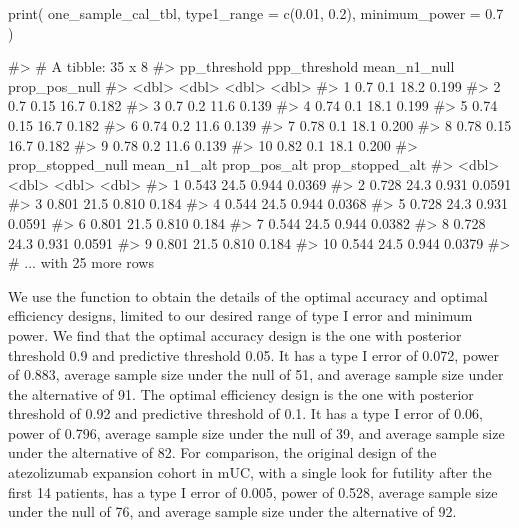 \begin{Schunk}
\begin{Sinput}
print(
  one_sample_cal_tbl,
  type1_range = c(0.01, 0.2),
  minimum_power = 0.7
  )
\end{Sinput}
\begin{Soutput}
#> # A tibble: 35 x 8
#>    pp_threshold ppp_threshold mean_n1_null prop_pos_null
#>           <dbl>         <dbl>        <dbl>         <dbl>
#>  1         0.7           0.1          18.2         0.199
#>  2         0.7           0.15         16.7         0.182
#>  3         0.7           0.2          11.6         0.139
#>  4         0.74          0.1          18.1         0.199
#>  5         0.74          0.15         16.7         0.182
#>  6         0.74          0.2          11.6         0.139
#>  7         0.78          0.1          18.1         0.200
#>  8         0.78          0.15         16.7         0.182
#>  9         0.78          0.2          11.6         0.139
#> 10         0.82          0.1          18.1         0.200
#>    prop_stopped_null mean_n1_alt prop_pos_alt prop_stopped_alt
#>                <dbl>       <dbl>        <dbl>            <dbl>
#>  1             0.543        24.5        0.944           0.0369
#>  2             0.728        24.3        0.931           0.0591
#>  3             0.801        21.5        0.810           0.184 
#>  4             0.544        24.5        0.944           0.0368
#>  5             0.728        24.3        0.931           0.0591
#>  6             0.801        21.5        0.810           0.184 
#>  7             0.544        24.5        0.944           0.0382
#>  8             0.728        24.3        0.931           0.0591
#>  9             0.801        21.5        0.810           0.184 
#> 10             0.544        24.5        0.944           0.0379
#> # ... with 25 more rows
\end{Soutput}
\end{Schunk}

We use the  function to obtain the details of
the optimal accuracy and optimal efficiency designs, limited to our
desired range of type I error and minimum power. We find that the
optimal accuracy design is the one with posterior threshold 0.9 and
predictive threshold 0.05. It has a type I error of 0.072, power of
0.883, average sample size under the null of 51, and average sample size
under the alternative of 91. The optimal efficiency design is the one
with posterior threshold of 0.92 and predictive threshold of 0.1. It has
a type I error of 0.06, power of 0.796, average sample size under the
null of 39, and average sample size under the alternative of 82. For
comparison, the original design of the atezolizumab expansion cohort in
mUC, with a single look for futility after the first 14 patients, has a
type I error of 0.005, power of 0.528, average sample size under the
null of 76, and average sample size under the alternative of 92.

